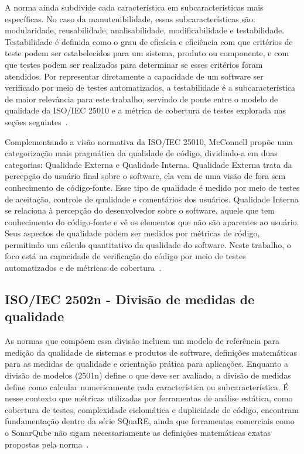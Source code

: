 A norma ainda subdivide cada característica em subcaracterísticas mais específicas. No caso da manutenibilidade, essas subcaracterísticas são: modularidade, reusabilidade, analisabilidade, modificabilidade e testabilidade.
Testabilidade é definida como o grau de eficácia e eficiência com que critérios de teste podem ser estabelecidos para um sistema, produto ou componente, e com que testes podem ser realizados para determinar se esses critérios foram atendidos.
Por representar diretamente a capacidade de um software ser verificado por meio de testes automatizados, a testabilidade é a subcaracterística de maior relevância para este trabalho, servindo de ponte entre o modelo de qualidade da ISO/IEC 25010 e a métrica de cobertura de testes explorada nas seções seguintes~\cite{iso25010}.

Complementando a visão normativa da ISO/IEC 25010, McConnell propõe uma categorização mais pragmática da qualidade de código, dividindo-a em duas categorias: Qualidade Externa e Qualidade Interna.
Qualidade Externa trata da percepção do usuário final sobre o software, ela vem de uma visão de fora sem conhecimento de código-fonte.
Esse tipo de qualidade é medido por meio de testes de aceitação, controle de qualidade e comentários dos usuários.
Qualidade Interna se relaciona à percepção do desenvolvedor sobre o software, aquele que tem conhecimento do código-fonte
e vê os elementos que não são aparentes ao usuário. Seus aspectos de qualidade podem ser medidos por métricas de código,
permitindo um cálculo quantitativo da qualidade do software. Neste trabalho, o foco está na capacidade de verificação do
código por meio de testes automatizados e de métricas de cobertura~\cite{mcconnell2004code}.

\subsection{ISO/IEC 2502n - Divisão de medidas de qualidade}

As normas que compõem essa divisão incluem um modelo de referência para medição da qualidade de sistemas e produtos de software, definições matemáticas para as medidas de qualidade e orientação prática para aplicações.
Enquanto a divisão de modelos (2501n) define o que deve ser avaliado, a divisão de medidas define como calcular numericamente cada característica ou subcaracterística.
É nesse contexto que métricas utilizadas por ferramentas de análise estática, como cobertura de testes, complexidade ciclomática e duplicidade de código, encontram fundamentação dentro da série SQuaRE, ainda que ferramentas comerciais como o SonarQube não sigam necessariamente as definições matemáticas exatas propostas pela norma~\cite{iso25000guide}.


